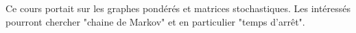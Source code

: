 Ce cours portait sur les graphes pondérés et matrices stochastiques. Les intéressés pourront chercher "chaine de Markov" et en particulier "temps d'arrêt".